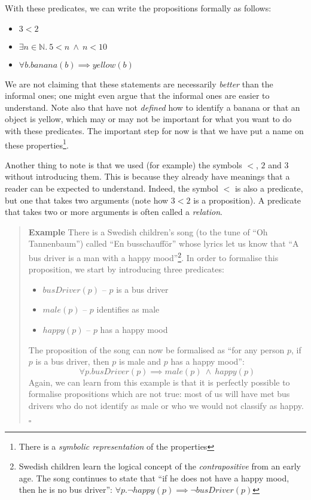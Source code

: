 \documentclass{tufte-handout}
\newcounter{example}
\newenvironment{example}
{\refstepcounter{example}\begin{quote}
\textbf{Example \arabic{example}}}
{

$\square$\end{quote}}
\begin{document}
With these predicates, we can write the propositions formally as
follows:

\begin{itemize}
\item $3 < 2$
\item $\exists n \in \mathbb{N} .~ 5 < n ~\land~ n < 10$
\item $\forall b. \mathit{banana}(b) \implies \mathit{yellow}(b)$
\end{itemize}

\noindent
We are not claiming that these statements are necessarily
\emph{better} than the informal ones; one might even argue that
the informal ones are easier to understand.
%
Note also that have not \emph{defined} how to identify a banana or
that an object is yellow, which may or may not be important for
what you want to do with these predicates. The important step for
now is that we have put a name on these properties\footnote{There
  is a \emph{symbolic representation} of the properties}.

Another thing to note is that we used (for example) the symbols
$<$, $2$ and $3$ without introducing them. This is because they
already have meanings that a reader can be expected to understand.
Indeed, the symbol $<$ is also a predicate, but one that takes two
arguments (note how $3 < 2$ is a proposition). A predicate that
takes two or more arguments is often called a \emph{relation}.

\begin{example}\label{ex:busdriver}
  There is a Swedish children's song (to the tune of ``Oh
  Tannenbaum'') called ``En busschauff\"{o}r'' whose lyrics let us
  know that ``A bus driver is a man with a happy
  mood''\footnote{Swedish children learn the logical concept of
    the \emph{contrapositive} from an early age. The song
    continues to state that ``if he does not have a happy mood,
    then he is no bus driver'':
    $\forall p. \lnot \mathit{happy}(p) \implies \lnot
    \mathit{busDriver}(p)$}. In order to formalise this
  proposition, we start by introducing three predicates:
  \begin{itemize}
  \item $\mathit{busDriver}(p)$ -- $p$ is a bus driver
  \item $\mathit{male}(p)$ -- $p$ identifies as male
  \item $\mathit{happy}(p)$ -- $p$ has a happy mood
  \end{itemize}
  The proposition of the song can now be formalised as ``for any
  person $p$, if $p$ is a bus driver, then $p$ is male and $p$ has
  a happy mood'':
  \[
    \forall p.
    \mathit{busDriver}(p) \implies
    \mathit{male}(p) ~\land~
    \mathit{happy}(p)
  \]
  Again, we can learn from this example is that it is perfectly
  possible to formalise propositions which are not true: most of
  us will have met bus drivers who do not identify as male or who
  we would not classify as happy.
\end{example}
\end{document}
